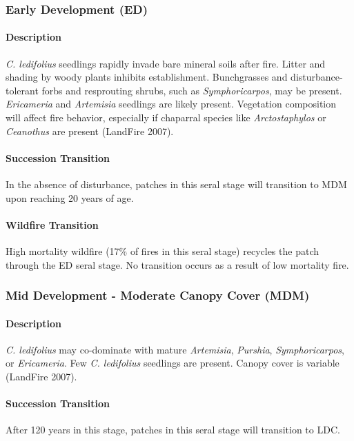 \subsubsection{Early Development (ED)}

\paragraph{Description} \emph{C. ledifolius} seedlings rapidly invade bare mineral soils after fire. Litter and shading by woody plants inhibits establishment. Bunchgrasses and disturbance-tolerant forbs and resprouting shrubs, such as \emph{Symphoricarpos}, may be present. \emph{Ericameria} and \emph{Artemisia} seedlings are likely present. Vegetation composition will affect fire behavior, especially if chaparral species like \emph{Arctostaphylos} or \emph{Ceanothus} are present (LandFire 2007).

\paragraph{Succession Transition} In the absence of disturbance, patches in this seral stage will transition to MDM upon reaching 20 years of age. 

\paragraph{Wildfire Transition} High mortality wildfire (17\% of fires in this seral stage) recycles the patch through the ED seral stage. No transition occurs as a result of low mortality fire.

\noindent\hrulefill


\subsubsection{Mid Development - Moderate Canopy Cover (MDM)}

\paragraph{Description} \emph{C. ledifolius} may co-dominate with mature \emph{Artemisia}, \emph{Purshia}, \emph{Symphoricarpos}, or \emph{Ericameria}. Few \emph{C. ledifolius} seedlings are present. Canopy cover is variable (LandFire 2007).

\paragraph{Succession Transition} After 120 years in this stage, patches in this seral stage will transition to LDC.

